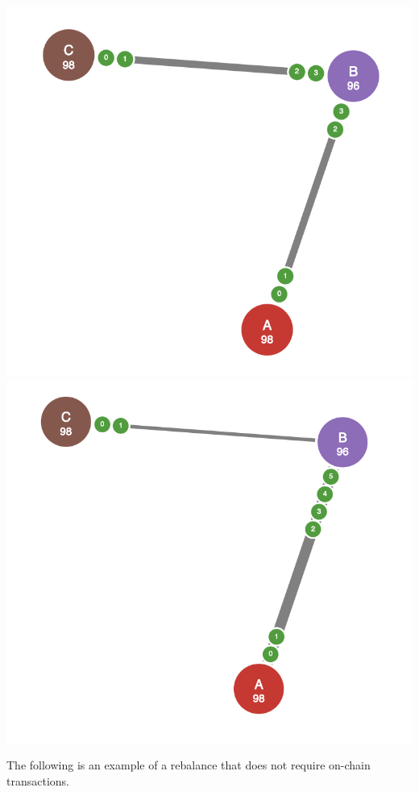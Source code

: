 \documentclass{article}
\begin{document}
\begin{center}
\includegraphics[scale=0.4]{on-chain-rebalancing-1.png}
\includegraphics[scale=0.4]{on-chain-rebalancing-2.png}
\end{center}

The following is an example of a rebalance that does not require on-chain transactions.
\end{document}
